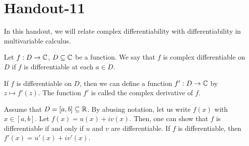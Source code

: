 \documentclass[a4paper]{article}
\begin{document}
\section{Handout-11}

In this handout, we will relate complex differentiability with differentiability in multivariable calculus.

\begin{definition}[ ]
    Let \( f: D \to \mathbb{C}  \), \( D \subseteq \mathbb{C}  \) be a function. We say that \( f  \) is complex differentiable on \( D  \) if \( f \) is differentiable at each \( a \in D  \).
\end{definition}
 If \( f  \) is differentiable on \( D  \), then we can define a function \( f' : D \to \mathbb{C}  \) by \( z \mapsto f'(z) \). The function \( f'  \) is called the complex derivative of \( f \).

 \begin{remark}
     Assume that \( D = [a,b] \subseteq \mathbb{R}  \). By abusing notation, let us write \( f(x) \) with \( x \in [a,b] \). Let \( f(x) = u(x) + i v(x) \). Then, one can show that \( f  \) is differentiable if and only if \( u  \) and \( v  \) are differentiable. If \( f  \) is differentiable, then \( f'(x) = u'(x) + i v'(x)  \).
 \end{remark}
\end{document}
